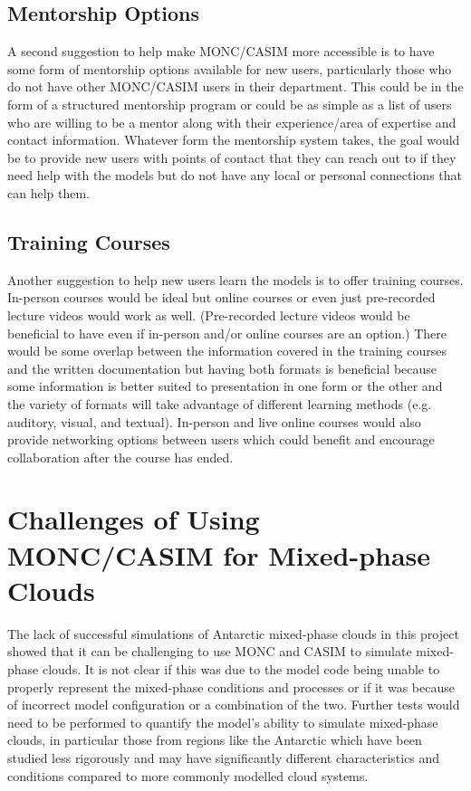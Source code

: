\subsection{Mentorship Options}
A second suggestion to help make MONC/CASIM more accessible is to have some form of mentorship options available for new users, particularly those who do not have other MONC/CASIM users in their department. This could be in the form of a structured mentorship program or could be as simple as a list of users who are willing to be a mentor along with their experience/area of expertise and contact information. Whatever form the mentorship system takes, the goal would be to provide new users with points of contact that they can reach out to if they need help with the models but do not have any local or personal connections that can help them.

\subsection{Training Courses}
Another suggestion to help new users learn the models is to offer training courses. In-person courses would be ideal but online courses or even just pre-recorded lecture videos would work as well. (Pre-recorded lecture videos would be beneficial to have even if in-person and/or online courses are an option.) There would be some overlap between the information covered in the training courses and the written documentation but having both formats is beneficial because some information is better suited to presentation in one form or the other and the variety of formats will take advantage of different learning methods (e.g. auditory, visual, and textual). In-person and live online courses would also provide networking options between users which could benefit and encourage collaboration after the course has ended.

\section{Challenges of Using MONC/CASIM for Mixed-phase Clouds}
The lack of successful simulations of Antarctic mixed-phase clouds in this project showed that it can be challenging to use MONC and CASIM to simulate mixed-phase clouds. It is not clear if this was due to the model code being unable to properly represent the mixed-phase conditions and processes or if it was because of incorrect model configuration or a combination of the two. Further tests would need to be performed to quantify the model’s ability to simulate mixed-phase clouds, in particular those from regions like the Antarctic which have been studied less rigorously and may have significantly different characteristics and conditions compared to more commonly modelled cloud systems.

